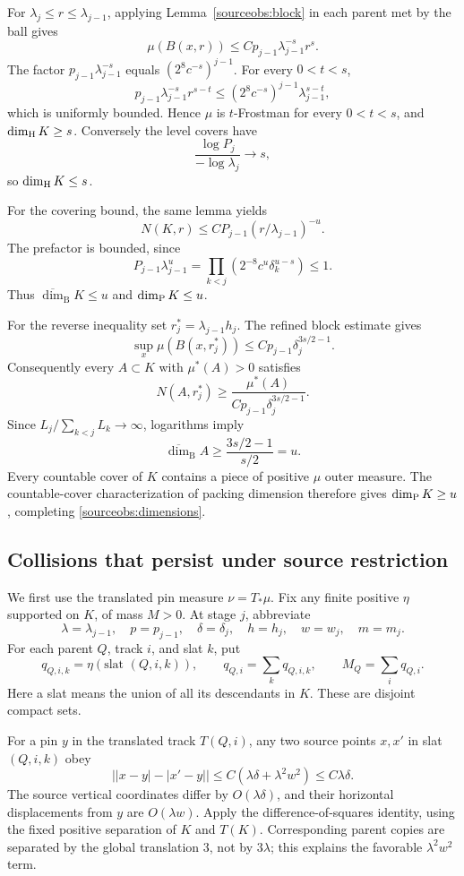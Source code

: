 For \(\lambda_j\le r\le\lambda_{j-1}\), applying
Lemma~\ref{sourceobs:block} in each parent met by the ball gives
\begin{equation}\label{sourceobs:frostman}
 \mu(B(x,r))\le
 C p_{j-1}\lambda_{j-1}^{-s}r^s.
\end{equation}
The factor \(p_{j-1}\lambda_{j-1}^{-s}\) equals
\((2^8c^{-s})^{j-1}\). For every \(0<t<s\),
\[
 p_{j-1}\lambda_{j-1}^{-s}r^{s-t}
 \le (2^8c^{-s})^{j-1}\lambda_{j-1}^{s-t},
\]
which is uniformly bounded. Hence \(\mu\) is \(t\)-Frostman for
every \(0<t<s\), and \(\dim_{\mathrm H} K\ge s\). Conversely the level covers
have
\[
 \frac{\log P_j}{-\log\lambda_j}\longrightarrow s,
\]
so \(\dim_{\mathrm H} K\le s\).

For the covering bound, the same lemma yields
\[
 N(K,r)\le C P_{j-1}(r/\lambda_{j-1})^{-u}.
\]
The prefactor is bounded, since
\[
 P_{j-1}\lambda_{j-1}^u
 =\prod_{k<j}(2^{-8}c^u\delta_k^{u-s})\le1.
\]
Thus \(\overline{\dim}_{\mathrm B}K\le u\) and \(\dim_{\mathrm P} K\le u\).

For the reverse inequality set \(r_j^*=\lambda_{j-1}h_j\).
The refined block estimate gives
\[
 \sup_x\mu(B(x,r_j^*))
 \le Cp_{j-1}\delta_j^{3s/2-1}.
\]
Consequently every \(A\subset K\) with \(\mu^*(A)>0\) satisfies
\[
 N(A,r_j^*)\ge
 \frac{\mu^*(A)}{Cp_{j-1}\delta_j^{3s/2-1}}.
\]
Since \(L_j/\sum_{k<j}L_k\to\infty\), logarithms imply
\[
 \overline{\dim}_{\mathrm B}A
 \ge\frac{3s/2-1}{s/2}=u.
\]
Every countable cover of \(K\) contains a piece of positive
\(\mu\) outer measure. The countable-cover characterization of
packing dimension therefore gives \(\dim_{\mathrm P} K\ge u\), completing
\eqref{sourceobs:dimensions}.

\subsection{Collisions that persist under source restriction}

We first use the translated pin measure \(\nu=T_*\mu\).
Fix any finite positive \(\eta\) supported on \(K\), of mass
\(M>0\). At stage \(j\), abbreviate
\[
 \lambda=\lambda_{j-1},\quad p=p_{j-1},\quad
 \delta=\delta_j,\quad h=h_j,\quad w=w_j,\quad m=m_j.
\]
For each parent \(Q\), track \(i\), and slat \(k\), put
\[
 q_{Q,i,k}=\eta(\text{slat }(Q,i,k)),\qquad
 q_{Q,i}=\sum_kq_{Q,i,k},\qquad M_Q=\sum_iq_{Q,i}.
\]
Here a slat means the union of all its descendants in \(K\).
These are disjoint compact sets.

For a pin \(y\) in the translated track \(T(Q,i)\), any two
source points \(x,x'\) in slat \((Q,i,k)\) obey
\begin{equation}\label{sourceobs:distancewidth}
 \big||x-y|-|x'-y|\big|
 \le C(\lambda\delta+\lambda^2w^2)
 \le C\lambda\delta.
\end{equation}
The source vertical coordinates differ by \(O(\lambda\delta)\),
and their horizontal displacements from \(y\) are
\(O(\lambda w)\). Apply the difference-of-squares identity,
using the fixed positive separation of \(K\) and \(T(K)\).
Corresponding parent copies are separated by the global translation
3, not by \(3\lambda\); this explains the favorable
\(\lambda^2w^2\) term.

